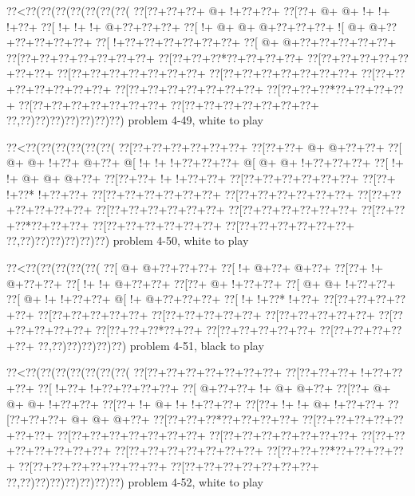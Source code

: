 \vbox{\vbox{\goo
\0??<\0??(\0??(\0??(\0??(\0??(\0??(\0??(
\0??[\0??+\0??+\0??+\- @+\- !+\0??+\0??+
\0??[\0??+\- @+\- @+\- !+\- !+\- !+\0??+
\0??[\- !+\- !+\- !+\- @+\0??+\0??+\0??+
\0??[\- !+\- @+\- @+\- @+\0??+\0??+\0??+
\- ![\- @+\- @+\0??+\0??+\0??+\0??+\0??+
\0??[\- !+\0??+\0??+\0??+\0??+\0??+\0??+
\0??[\- @+\- @+\0??+\0??+\0??+\0??+\0??+
\0??[\0??+\0??+\0??+\0??+\0??+\0??+\0??+
\0??[\0??+\0??+\0??*\0??+\0??+\0??+\0??+
\0??[\0??+\0??+\0??+\0??+\0??+\0??+\0??+
\0??[\0??+\0??+\0??+\0??+\0??+\0??+\0??+
\0??[\0??+\0??+\0??+\0??+\0??+\0??+\0??+
\0??[\0??+\0??+\0??+\0??+\0??+\0??+\0??+
\0??[\0??+\0??+\0??+\0??+\0??+\0??+\0??+
\0??[\0??+\0??+\0??*\0??+\0??+\0??+\0??+
\0??[\0??+\0??+\0??+\0??+\0??+\0??+\0??+
\0??[\0??+\0??+\0??+\0??+\0??+\0??+\0??+
\0??,\0??)\0??)\0??)\0??)\0??)\0??)\0??)
}
\hfil problem 4-49, white to play\hfil\break
}

\vbox{\vbox{\goo
\0??<\0??(\0??(\0??(\0??(\0??(\0??(
\0??[\0??+\0??+\0??+\0??+\0??+\0??+
\0??[\0??+\0??+\- @+\- @+\0??+\0??+
\0??[\- @+\- @+\- !+\0??+\- @+\0??+
\- @[\- !+\- !+\- !+\0??+\0??+\0??+
\- @[\- @+\- @+\- !+\0??+\0??+\0??+
\0??[\- !+\- !+\- @+\- @+\- @+\0??+
\0??[\0??+\0??+\- !+\- !+\0??+\0??+
\0??[\0??+\0??+\0??+\0??+\0??+\0??+
\0??[\0??+\- !+\0??*\- !+\0??+\0??+
\0??[\0??+\0??+\0??+\0??+\0??+\0??+
\0??[\0??+\0??+\0??+\0??+\0??+\0??+
\0??[\0??+\0??+\0??+\0??+\0??+\0??+
\0??[\0??+\0??+\0??+\0??+\0??+\0??+
\0??[\0??+\0??+\0??+\0??+\0??+\0??+
\0??[\0??+\0??+\0??*\0??+\0??+\0??+
\0??[\0??+\0??+\0??+\0??+\0??+\0??+
\0??[\0??+\0??+\0??+\0??+\0??+\0??+
\0??,\0??)\0??)\0??)\0??)\0??)\0??)
}
\hfil problem 4-50, white to play\hfil\break
}

\vbox{\vbox{\goo
\0??<\0??(\0??(\0??(\0??(\0??(
\0??[\- @+\- @+\0??+\0??+\0??+
\0??[\- !+\- @+\0??+\- @+\0??+
\0??[\0??+\- !+\- @+\0??+\0??+
\0??[\- !+\- !+\- @+\0??+\0??+
\0??[\0??+\- @+\- !+\0??+\0??+
\0??[\- @+\- @+\- !+\0??+\0??+
\0??[\- @+\- !+\- !+\0??+\0??+
\- @[\- !+\- @+\0??+\0??+\0??+
\0??[\- !+\- !+\0??*\- !+\0??+
\0??[\0??+\0??+\0??+\0??+\0??+
\0??[\0??+\0??+\0??+\0??+\0??+
\0??[\0??+\0??+\0??+\0??+\0??+
\0??[\0??+\0??+\0??+\0??+\0??+
\0??[\0??+\0??+\0??+\0??+\0??+
\0??[\0??+\0??+\0??*\0??+\0??+
\0??[\0??+\0??+\0??+\0??+\0??+
\0??[\0??+\0??+\0??+\0??+\0??+
\0??,\0??)\0??)\0??)\0??)\0??)
}
\hfil problem 4-51, black to play\hfil\break
}

\vbox{\vbox{\goo
\0??<\0??(\0??(\0??(\0??(\0??(\0??(\0??(
\0??[\0??+\0??+\0??+\0??+\0??+\0??+\0??+
\0??[\0??+\0??+\0??+\- !+\0??+\0??+\0??+
\0??[\- !+\0??+\- !+\0??+\0??+\0??+\0??+
\0??[\- @+\0??+\0??+\- !+\- @+\- @+\0??+
\0??[\0??+\- @+\- @+\- @+\- !+\0??+\0??+
\0??[\0??+\- !+\- @+\- !+\- !+\0??+\0??+
\0??[\0??+\- !+\- !+\- @+\- !+\0??+\0??+
\0??[\0??+\0??+\0??+\- @+\- @+\- @+\0??+
\0??[\0??+\0??+\0??*\0??+\0??+\0??+\0??+
\0??[\0??+\0??+\0??+\0??+\0??+\0??+\0??+
\0??[\0??+\0??+\0??+\0??+\0??+\0??+\0??+
\0??[\0??+\0??+\0??+\0??+\0??+\0??+\0??+
\0??[\0??+\0??+\0??+\0??+\0??+\0??+\0??+
\0??[\0??+\0??+\0??+\0??+\0??+\0??+\0??+
\0??[\0??+\0??+\0??*\0??+\0??+\0??+\0??+
\0??[\0??+\0??+\0??+\0??+\0??+\0??+\0??+
\0??[\0??+\0??+\0??+\0??+\0??+\0??+\0??+
\0??,\0??)\0??)\0??)\0??)\0??)\0??)\0??)
}
\hfil problem 4-52, white to play\hfil\break
}

